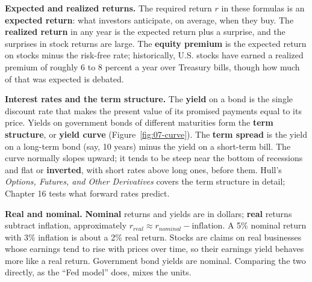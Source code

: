 
\textbf{Expected and realized returns.} The required return $r$ in these formulas is an \textbf{expected return}: what investors anticipate, on average, when they buy. The \textbf{realized return} in any year is the expected return plus a surprise, and the surprises in stock returns are large. The \textbf{equity premium} is the expected return on stocks minus the risk-free rate; historically, U.S. stocks have earned a realized premium of roughly 6 to 8 percent a year over Treasury bills, though how much of that was expected is debated.

\textbf{Interest rates and the term structure.} The \textbf{yield} on a bond is the single discount rate that makes the present value of its promised payments equal to its price. Yields on government bonds of different maturities form the \textbf{term structure}, or \textbf{yield curve} (Figure~\ref{fig:07-curve}). The \textbf{term spread} is the yield on a long-term bond (say, 10 years) minus the yield on a short-term bill. The curve normally slopes upward; it tends to be steep near the bottom of recessions and flat or \textbf{inverted}, with short rates above long ones, before them. Hull's \emph{Options, Futures, and Other Derivatives} covers the term structure in detail; Chapter 16 tests what forward rates predict.


\textbf{Real and nominal.} \textbf{Nominal} returns and yields are in dollars; \textbf{real} returns subtract inflation, approximately $r_{real} \approx r_{nominal} - \text{inflation}$. A 5\% nominal return with 3\% inflation is about a 2\% real return. Stocks are claims on real businesses whose earnings tend to rise with prices over time, so their earnings yield behaves more like a real return. Government bond yields are nominal. Comparing the two directly, as the ``Fed model'' does, mixes the units.

